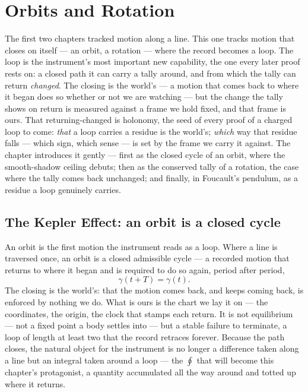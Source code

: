 \chapter{Orbits and Rotation}
\label{chap:orbits-and-rotation}

The first two chapters tracked motion along a line. This one tracks motion that closes on itself --- an
orbit, a rotation --- where the record becomes a loop. The loop is the instrument's most important new
capability, the one every later proof rests on: a closed path it can carry a tally around, and from which the
tally can return \emph{changed}. The closing is the world's --- a motion that comes back to where it began does
so whether or not we are watching --- but the change the tally shows on return is measured against a frame we
hold fixed, and that frame is ours. That returning-changed is holonomy, the seed of every proof of a charged
loop to come: \emph{that} a loop carries a residue is the world's; \emph{which} way that residue falls --- which
sign, which sense --- is set by the frame we carry it against. The chapter introduces it gently --- first as
the closed cycle of an orbit, where the smooth-shadow ceiling debuts; then as the conserved tally of a
rotation, the case where the tally comes back unchanged; and finally, in Foucault's pendulum, as a residue a
loop genuinely carries.

\section{The Kepler Effect: an orbit is a closed cycle}
\label{se:kepler}

An orbit is the first motion the instrument reads as a loop. Where a line is traversed once, an orbit is a
closed admissible cycle --- a recorded motion that returns to where it began and is required to do so again,
period after period,
\begin{equation}
  \gamma(t + T) = \gamma(t).
\end{equation}
The closing is the world's: that the motion comes back, and keeps coming back, is enforced by nothing we do.
What is ours is the chart we lay it on --- the coordinates, the origin, the clock that stamps each return. It
is not equilibrium --- not a fixed point a body settles into --- but a stable failure to terminate, a loop of
length at least two that the record retraces forever. Because the path closes, the natural object for the
instrument is no longer a difference taken along a line but an integral taken around a loop --- the $\oint$
that will become this chapter's protagonist, a quantity accumulated all the way around and totted up where it
returns.

